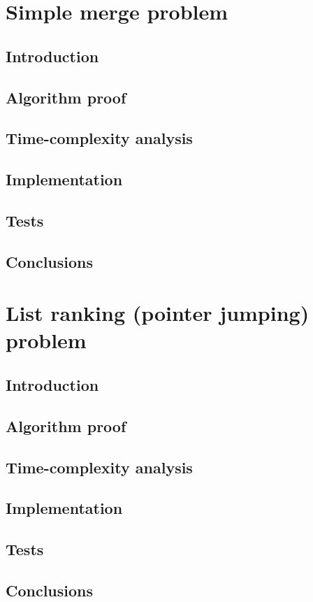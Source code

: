 \documentclass[a4paper,10pt,notitlepage]{article}
\begin{document}
\section{Simple merge problem}

\subsection{Introduction}

\subsection{Algorithm proof}

\subsection{Time-complexity analysis}

\subsection{Implementation}

\subsection{Tests}

\subsection{Conclusions}


\section{List ranking (pointer jumping) problem}

\subsection{Introduction}

\subsection{Algorithm proof}

\subsection{Time-complexity analysis}

\subsection{Implementation}

\subsection{Tests}

\subsection{Conclusions}
\end{document}
